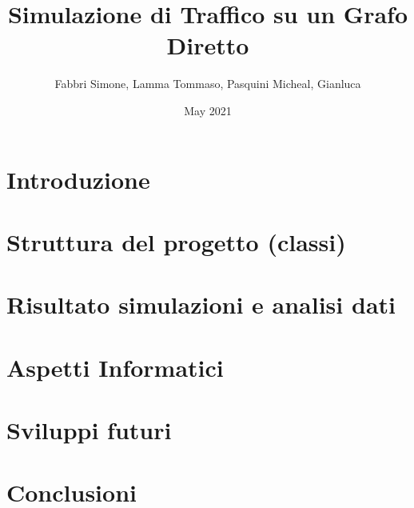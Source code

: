 \documentclass{article}
\title{Simulazione di Traffico su un Grafo Diretto}
\author{ Fabbri Simone, Lamma Tommaso, Pasquini Micheal, Gianluca }
\date{May 2021}
\begin{document}
\maketitle

\tableofcontents

\newpage

\section{Introduzione}

    

\section{Struttura del progetto (classi)}

    

\section{Risultato simulazioni e analisi dati}

\section{Aspetti Informatici}

    

\section{Sviluppi futuri}
\label{section:sviluppi}

    

\section{Conclusioni}

    







\end{document}
